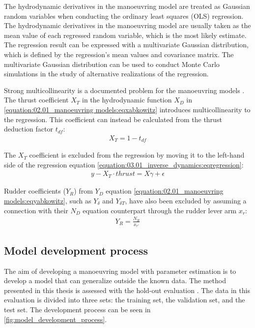 \noindent The hydrodynamic derivatives in the manoeuvring model are treated as Gaussian random variables when conducting the ordinary least squares (OLS) regression. The hydrodynamic derivatives in the manoeuvring model are usually taken as the mean value of each regressed random variable, which is the most likely estimate. The regression result can be expressed with a multivariate Gaussian distribution, which is defined by the regression’s mean values and covariance matrix. The multivariate Gaussian distribution can be used to conduct Monte Carlo simulations in the study of alternative realizations of the regression.


Strong multicollinearity is a documented problem for the manoeuvring models \cite{luo_parameter_2016, wang_quantifying_2018}.
The thrust coefficient \(X_T\) in the hydrodynamic function \(X_D\) in \autoref{equation:02.01_manoeuvring models:eqxabkowitz} introduces multicollinearity to the regression. This coefficient can instead be calculated from the thrust deduction factor \(t_{df}\):
\begin{equation}\label{equation:03.01_inverse_dynamics:eqXthrust}
\begin{split}\displaystyle X_{T} = 1 - t_{df}\end{split}
\end{equation}

\noindent The \(X_T\) coefficient is excluded from the regression by moving it to the left-hand side of the regression equation \autoref{equation:03.01_inverse_dynamics:eqregression}:
\begin{equation}\label{equation:03.01_inverse_dynamics:eqexclude}
\begin{split}y-X_T \cdot thrust = X \gamma + \epsilon\end{split}
\end{equation}

\noindent Rudder coefficients (\(Y_R\)) from \(Y_D\) equation \autoref{equation:02.01_manoeuvring models:eqyabkowitz}, such as \(Y_{\delta}\) and \(Y_{\delta T}\), have also been excluded by assuming a connection with their \(N_D\) equation counterpart through the rudder lever arm \(x_r\):
\begin{equation}\label{equation:03.01_inverse_dynamics:eqyr}
\begin{split}\displaystyle Y_{R} = \frac{N_{R}}{x_{r'}}\end{split}
\end{equation}

\subsection{Model development process}
\label{sec:model_development_process}
The aim of developing a manoeuvring model with parameter estimation is to develop a model that can generalize outside the known data. The method presented in this thesis is assessed with the hold-out evaluation \cite{sammut_holdout_2017}. The data in this evaluation is divided into three sets: the training set, the validation set, and the test set. The development process can be seen in \autoref{fig:model_development_process}.


